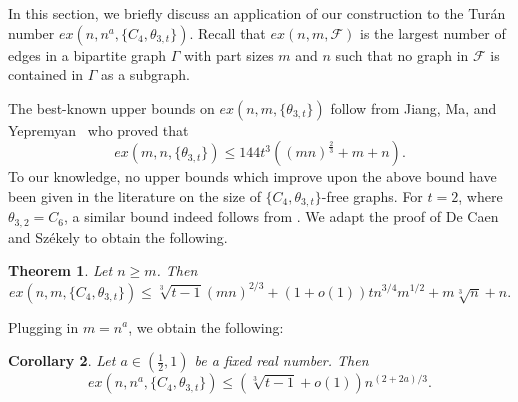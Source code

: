 \documentclass[12pt]{article}
\newtheorem{thm}{Theorem}[section]
\newtheorem{cor}[thm]{Corollary}
\begin{document}
In this section, we briefly discuss an application of our construction to the Tur\'{a}n number $ex(n, n^{a}, \{C_4, \theta_{3, t}\})$. Recall that 
$ex(n, m, \mathcal{F})$ is the largest number of edges in a bipartite graph $\Gamma$ with part sizes $m$ and $n$ such that no graph in $\mathcal{F}$ is contained in $\Gamma$ as a subgraph. 

The best-known upper bounds on $ex(n, m, \{\theta_{3, t} \})$ follow from Jiang, Ma,
and Yepremyan~\cite{JiangMaYepremyan2022} who proved that 
$$
ex(m, n, \{ \theta_{3, t} \}) \leq 144t^3((mn)^{\frac{2}{3}} + m + n).
$$
To our knowledge, no upper bounds which improve upon the above bound have been given in the literature on the size of $\{ C_4, \theta_{3, t}\}$-free graphs. For $t = 2$, where $\theta_{3, 2} = C_6$, a similar bound indeed follows from \cite{deCaenSzekely1997, Neuwirth}. We adapt the proof of De Caen and Sz\'ekely \cite{deCaenSzekely1997} to obtain the following.

\begin{thm}
\label{thm:TuranUpper}
    Let $n\geq m$. Then 
    $$
    ex(n, m, \{ C_4, \theta_{3, t} \}) \leq \sqrt[3]{t-1}(mn)^{2/3} + (1+o(1))tn^{3/4}m^{1/2} + m\sqrt[3]{n}+n.
    $$
\end{thm}

Plugging in $m = n^a$, we obtain the following:

\begin{cor}
    Let $a\in (\frac{1}{2}, 1)$ be a fixed real number. Then 
    $$
    ex(n, n^a, \{ C_4, \theta_{3, t} \}) \leq (\sqrt[3]{t-1} + o(1))n^{(2 + 2a)/3}.
    $$
\end{cor}
\end{document}
